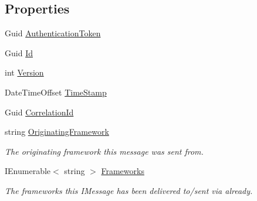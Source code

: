 \subsection*{Properties}
\begin{DoxyCompactItemize}
\item 
Guid \hyperlink{classCqrs_1_1Azure_1_1ServiceBus_1_1Tests_1_1Unit_1_1TestEvent_a3cc3380a0c4a9dce42f2b306a9b6023b_a3cc3380a0c4a9dce42f2b306a9b6023b}{Authentication\+Token}
\item 
Guid \hyperlink{classCqrs_1_1Azure_1_1ServiceBus_1_1Tests_1_1Unit_1_1TestEvent_a5c67228f956f56289a57d4c08e4b611e_a5c67228f956f56289a57d4c08e4b611e}{Id}
\item 
int \hyperlink{classCqrs_1_1Azure_1_1ServiceBus_1_1Tests_1_1Unit_1_1TestEvent_aa7a01fed424a068f05d38cdd70ad8890_aa7a01fed424a068f05d38cdd70ad8890}{Version}
\item 
Date\+Time\+Offset \hyperlink{classCqrs_1_1Azure_1_1ServiceBus_1_1Tests_1_1Unit_1_1TestEvent_ad45c3e187502e0c8e367511900c8a808_ad45c3e187502e0c8e367511900c8a808}{Time\+Stamp}
\item 
Guid \hyperlink{classCqrs_1_1Azure_1_1ServiceBus_1_1Tests_1_1Unit_1_1TestEvent_a713230eebc1d248dd7245b80553abac4_a713230eebc1d248dd7245b80553abac4}{Correlation\+Id}
\item 
string \hyperlink{classCqrs_1_1Azure_1_1ServiceBus_1_1Tests_1_1Unit_1_1TestEvent_a7945da825eb0d9a101732bfb4b3d8074_a7945da825eb0d9a101732bfb4b3d8074}{Originating\+Framework}
\begin{DoxyCompactList}\small\item\em The originating framework this message was sent from. \end{DoxyCompactList}\item 
I\+Enumerable$<$ string $>$ \hyperlink{classCqrs_1_1Azure_1_1ServiceBus_1_1Tests_1_1Unit_1_1TestEvent_abbfe10acad422a8664ab50dc28f514f6_abbfe10acad422a8664ab50dc28f514f6}{Frameworks}
\begin{DoxyCompactList}\small\item\em The frameworks this I\+Message has been delivered to/sent via already. \end{DoxyCompactList}\end{DoxyCompactItemize}


